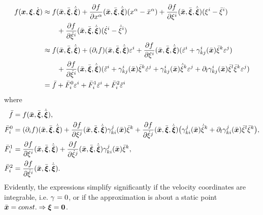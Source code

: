 \begin{align}
 f(\sysCoord, \sysVel, \sysVeld) 
  &\approx f(\sysCoordB, \sysVelB, \sysVelBd) 
  + \pdiff[f]{\sysCoordCoeff{\GidxI}}(\sysCoordB, \sysVelB, \sysVelBd) (\sysCoordCoeff{\GidxI} - \sysCoordCoeffB{\GidxI})
  + \pdiff[f]{\sysVelCoeff{\LidxI}}(\sysCoordB, \sysVelB, \sysVelBd) (\sysVelCoeff{\LidxI} - \sysVelCoeffB{\LidxI})
\nonumber\\
  &\qquad + \pdiff[f]{\sysVelCoeffd{\LidxI}}(\sysCoordB, \sysVelB, \sysVelBd) (\sysVelCoeffd{\LidxI} - \sysVelCoeffBd{\LidxI})
\nonumber\\
  &\approx f(\sysCoordB, \sysVelB, \sysVelBd) 
  + (\dirDiff{\LidxI}f) (\sysCoordB, \sysVelB, \sysVelBd) \LinErrorCoordCoeff{\LidxI}
  + \pdiff[f]{\sysVelCoeff{\LidxI}}(\sysCoordB, \sysVelB, \sysVelBd) (\LinErrorCoordCoeffd{\LidxI} + \BoltzSym{\LidxI}{\LidxIII}{\LidxII}(\sysCoordB) \sysVelCoeffB{\LidxIII} \LinErrorCoordCoeff{\LidxII})
\nonumber\\
  &\qquad 
  + \pdiff[f]{\sysVelCoeffd{\LidxI}}(\sysCoordB, \sysVelB, \sysVelBd) (\LinErrorCoordCoeffdd{\LidxI} + \BoltzSym{\LidxI}{\LidxIII}{\LidxII}(\sysCoordB) \sysVelCoeffB{\LidxIII} \LinErrorCoordCoeffd{\LidxII}  + \BoltzSym{\LidxI}{\LidxIII}{\LidxII}(\sysCoordB) \sysVelCoeffBd{\LidxIII} \LinErrorCoordCoeff{\LidxII}  + \dirDiff{\LidxIV}\BoltzSym{\LidxI}{\LidxIII}{\LidxII}(\sysCoordB) \sysVelCoeffB{\LidxIV} \sysVelCoeffB{\LidxIII} \LinErrorCoordCoeff{\LidxII})
\nonumber\\
 &= \bar{f} + \bar{F}^0_\LidxI \LinErrorCoordCoeff{\LidxI} + \bar{F}^1_\LidxI \LinErrorCoordCoeffd{\LidxI} + \bar{F}^2_\LidxI \LinErrorCoordCoeffdd{\LidxI}
\end{align}
where
\begin{align*}
 \bar{f} &= f(\sysCoordB, \sysVelB, \sysVelBd),
\\
 \bar{F}^0_\LidxI &= (\dirDiff{\LidxI}f) (\sysCoordB, \sysVelB, \sysVelBd) + \pdiff[f]{\sysVelCoeff{\LidxII}}(\sysCoordB, \sysVelB, \sysVelBd) \BoltzSym{\LidxII}{\LidxIII}{\LidxI}(\sysCoordB) \sysVelCoeffB{\LidxIII} + \pdiff[f]{\sysVelCoeffd{\LidxII}}(\sysCoordB, \sysVelB, \sysVelBd) \big( \BoltzSym{\LidxII}{\LidxIII}{\LidxI}(\sysCoordB) \sysVelCoeffBd{\LidxIII} + \dirDiff{\LidxIV}\BoltzSym{\LidxII}{\LidxIII}{\LidxI}(\sysCoordB) \sysVelCoeffB{\LidxIV} \sysVelCoeffB{\LidxIII} \big),
\\
 \bar{F}^1_\LidxI &= \pdiff[f]{\sysVelCoeff{\LidxI}}(\sysCoordB, \sysVelB, \sysVelBd) + \pdiff[f]{\sysVelCoeffd{\LidxII}}(\sysCoordB, \sysVelB, \sysVelBd) \BoltzSym{\LidxII}{\LidxIII}{\LidxI}(\sysCoordB) \sysVelCoeffB{\LidxIII},
\\
 \bar{F}^2_\LidxI &= \pdiff[f]{\sysVelCoeffd{\LidxI}}(\sysCoordB, \sysVelB, \sysVelBd).
\end{align*}
Evidently, the expressions simplify significantly if the velocity coordinates are integrable, i.e. $\BoltzSym{}{}{} = 0$, or if the approximation is about a static point $\sysCoordB = \const \Rightarrow \sysVel = \tuple{0}$.


